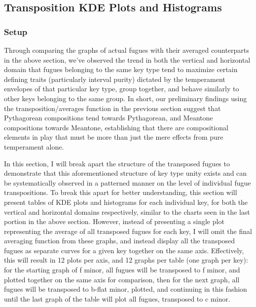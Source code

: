     \subsection{Transposition KDE Plots and
Histograms}\label{transposition-kde-plots-and-histograms}

\subsubsection{Setup}\label{setup}

Through comparing the graphs of actual fugues with their averaged
counterparts in the above section, we've observed the trend in both the
vertical and horizontal domain that fugues belonging to the same key
type tend to maximize certain defining traits (particularly interval
purity) dictated by the temperament envelopes of that particular key
type, group together, and behave similarly to other keys belonging to
the same group. In short, our preliminary findings using the
transposition/averages function in the previous section suggest that
Pythagorean compositions tend towards Pythagorean, and Meantone
compositions towards Meantone, establishing that there are compositional
elements in play that must be more than just the mere effects from pure
temperament alone.

In this section, I will break apart the structure of the transposed
fugues to demonstrate that this aforementioned structure of key type
unity exists and can be systematically observed in a patterned manner on
the level of individual fugue transpositions. To break this apart for
better understanding, this section will present tables of KDE plots and
histograms for each individual key, for both the vertical and horizontal
domains respectively, similar to the charts seen in the last portion in
the above section. However, instead of presenting a single plot
representing the average of all transposed fugues for each key, I will
omit the final averaging function from these graphs, and instead display
all the transposed fugues as separate curves for a given key together on
the same axis. Effectively, this will result in 12 plots per axis, and
12 graphs per table (one graph per key): for the starting graph of f
minor, all fugues will be transposed to f minor, and plotted together on
the same axis for comparison, then for the next graph, all fugues will
be transposed to b-flat minor, plotted, and continuing in this fashion
until the last graph of the table will plot all fugues, transposed to c
minor.

